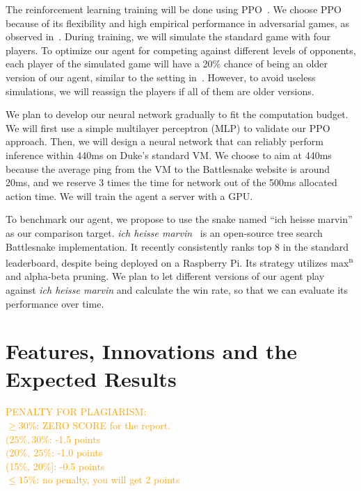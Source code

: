 \documentclass[a4paper]{article}
\newcommand{\instruction}[1]{\textcolor{orange}{#1}}
\begin{document}
The reinforcement learning training will be done using
PPO~\cite{schulman2017proximal}.
We choose PPO because of its flexibility and high empirical performance in
adversarial games,
as observed
in~\cite{berner2019dota,binnersley2020battlesnake,chung2020battlesnake}.
During training, we will simulate the standard game with four players.
To optimize our agent for competing against different levels of opponents,
each player of the simulated game will have a 20\% chance of being an older
version of our agent, similar to the setting in~\cite{silver2017mastering}.
However, to avoid useless simulations,
we will reassign the players if all of them are older versions.

We plan to develop our neural network gradually to fit the computation budget.
We will first use a simple multilayer perceptron (MLP)
to validate our PPO approach. Then,
we will design a neural network that can reliably perform inference within 440ms
on Duke's standard VM.
We choose to aim at 440ms because the average ping from the VM to the
Battlesnake website is around 20ms,
and we reserve 3 times the time for network out of the 500ms allocated action
time. We will train the agent a server with a GPU.

To benchmark our agent,
we propose to use the snake named ``ich heisse marvin'' as our comparison
target. \emph{ich heisse marvin}~\cite{wrenger2024rusty}
is an open-source tree search Battlesnake implementation.
It recently consistently ranks top 8 in the standard leaderboard,
despite being deployed on a Raspberry Pi. Its strategy utilizes
max\textsuperscript{n} and alpha-beta pruning.
We plan to let different versions of our agent play against \emph{ich heisse
    marvin} and calculate the win rate,
so that we can evaluate its performance over time.

\section{Features, Innovations and the Expected Results}

\instruction{
    PENALTY FOR PLAGIARISM:\\
    \(\geq 30\%\): ZERO SCORE for the report.\\
    \((25\%,30\%\): -1.5 points\\
    \((20\%,\ 25\%\): -1.0 points\\
    (15\%, 20\%]: -0.5 points\\
    \(\leq 15\%\): no penalty, you will get 2 points
}

\printbibliography
\end{document}
